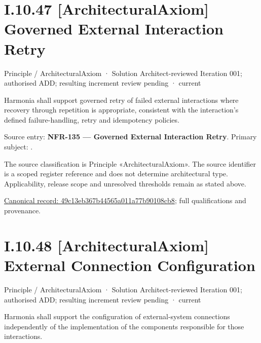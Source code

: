 \section*{I.10.47 [ArchitecturalAxiom] Governed External Interaction Retry}
\label{navigation:I.10.47}

\label{element:49c13eb367b44565a011a77b90108cb8}
{\small Principle / ArchitecturalAxiom · Solution Architect-reviewed Iteration 001; authorised ADD; resulting increment review pending · current}\par

Harmonia shall support governed retry of failed external interactions where recovery through repetition is appropriate, consistent with the interaction's defined failure-handling, retry and idempotency policies.



Source entry: \textbf{NFR-135 — Governed External Interaction Retry}. Primary subject: \texttt{}.



The source classification is Principle «ArchitecturalAxiom». The source identifier is a scoped register reference and does not determine architectural type. Applicability, release scope and unresolved thresholds remain as stated above.


{\footnotesize \href{../../../../../../../continuum/motivation/principle/architectural-axiom/49c13eb367b44565a011a77b90108cb8.md}{Canonical record: 49c13eb367b44565a011a77b90108cb8}; full qualifications and provenance.}\par
\section*{I.10.48 [ArchitecturalAxiom] External Connection Configuration}
\label{navigation:I.10.48}

\label{element:f24e63c49135411bbfbc06f9385aeea5}
{\small Principle / ArchitecturalAxiom · Solution Architect-reviewed Iteration 001; authorised ADD; resulting increment review pending · current}\par

Harmonia shall support the configuration of external-system connections independently of the implementation of the components responsible for those interactions.



